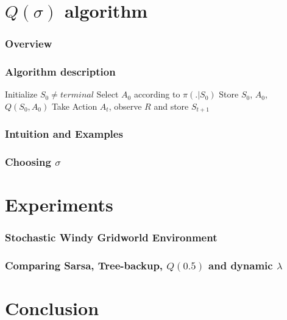 \documentclass{beamer}
\begin{document}
\section{$Q(\sigma)$ algorithm}

\begin{frame}
  \frametitle{Overview}
\end{frame}

\begin{frame}
  \frametitle{Algorithm description}
  \begin{algorithmic}
    \STATE Initialize $S_0 \neq {terminal}$
    \STATE Select $A_0$ according to $\pi(. | S_0)$
    \STATE Store $S_0$, $A_0$, $Q(S_0, A_0)$
        \STATE Take Action $A_t$, observe $R$ and store $S_{t + 1}$
      \ENDIF
    \ENDFOR
  \end{algorithmic}
\end{frame}

\begin{frame}
  \frametitle{Intuition and Examples}
\end{frame}

\begin{frame}
  \frametitle{Choosing $\sigma$}
\end{frame}

\section{Experiments}

\begin{frame}
  \frametitle{Stochastic Windy Gridworld Environment}
\end{frame}

\begin{frame}
  \frametitle{Comparing Sarsa, Tree-backup, $Q(0.5)$ and dynamic $\lambda$}
\end{frame}

\section{Conclusion}
\end{document}
